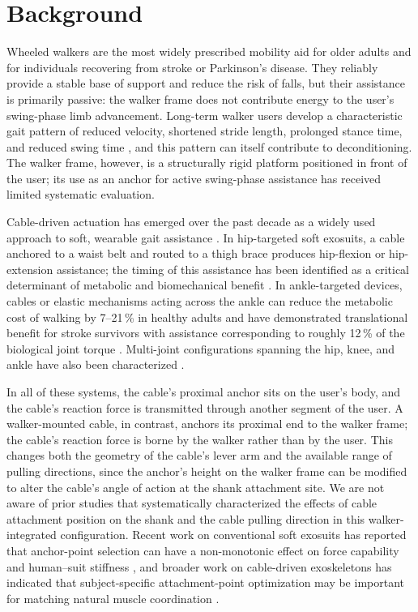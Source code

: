 \documentclass[11pt,a4paper]{article}
\begin{document}
\section{Background}

Wheeled walkers are the most widely prescribed mobility aid for older adults and for individuals recovering from stroke or Parkinson's disease. They reliably provide a stable base of support and reduce the risk of falls, but their assistance is primarily passive: the walker frame does not contribute energy to the user's swing-phase limb advancement. Long-term walker users develop a characteristic gait pattern of reduced velocity, shortened stride length, prolonged stance time, and reduced swing time \citep{apte2018,sawicki2020}, and this pattern can itself contribute to deconditioning. The walker frame, however, is a structurally rigid platform positioned in front of the user; its use as an anchor for active swing-phase assistance has received limited systematic evaluation.

Cable-driven actuation has emerged over the past decade as a widely used approach to soft, wearable gait assistance \citep{asbeck2015,sawicki2020}. In hip-targeted soft exosuits, a cable anchored to a waist belt and routed to a thigh brace produces hip-flexion or hip-extension assistance; the timing of this assistance has been identified as a critical determinant of metabolic and biomechanical benefit \citep{ding2016,kim2022}. In ankle-targeted devices, cables or elastic mechanisms acting across the ankle can reduce the metabolic cost of walking by 7--21\,\% in healthy adults \citep{collins2015,galle2017} and have demonstrated translational benefit for stroke survivors with assistance corresponding to roughly 12\,\% of the biological joint torque \citep{awad2017}. Multi-joint configurations spanning the hip, knee, and ankle have also been characterized \citep{quinlivan2017,lee2018,bryan2021}.

In all of these systems, the cable's proximal anchor sits on the user's body, and the cable's reaction force is transmitted through another segment of the user. A walker-mounted cable, in contrast, anchors its proximal end to the walker frame; the cable's reaction force is borne by the walker rather than by the user. This changes both the geometry of the cable's lever arm and the available range of pulling directions, since the anchor's height on the walker frame can be modified to alter the cable's angle of action at the shank attachment site. We are not aware of prior studies that systematically characterized the effects of cable attachment position on the shank and the cable pulling direction in this walker-integrated configuration. Recent work on conventional soft exosuits has reported that anchor-point selection can have a non-monotonic effect on force capability and human--suit stiffness \citep{kimleelab2022}, and broader work on cable-driven exoskeletons has indicated that subject-specific attachment-point optimization may be important for matching natural muscle coordination \citep{chen2024}.
\end{document}
